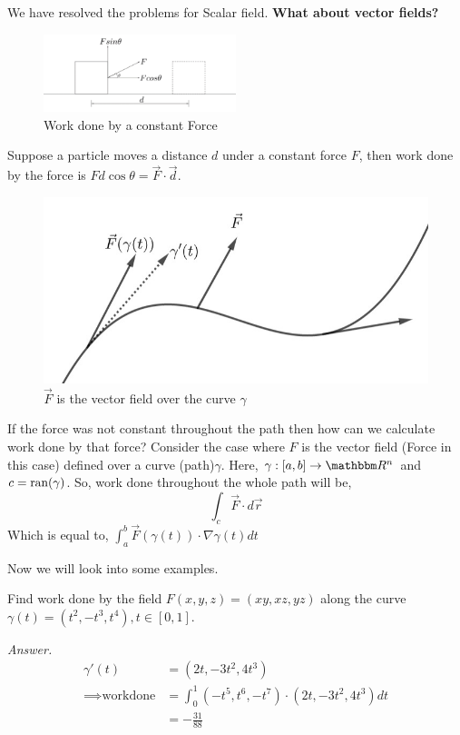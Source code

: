 \documentclass[../Analysis-3]{subfiles}
\begin{document}
We have resolved the problems for Scalar field. \textbf{What about vector fields?}
\begin{figure}[H]
    \centering
    \includegraphics[width=0.5\textwidth]{../figures/lec-23.2.png}
    \caption{Work done by a constant Force}
\end{figure}
Suppose a particle moves a distance $d$ under a constant force $F$, then work done by the force is $Fd\cos{\theta} = \vec{F}\cdot\vec{d}$.


\begin{figure}
    \centering
    \includegraphics[width=.98\linewidth]{../figures/lec-23.3.png}
    \caption{$\vec{F}$ is the vector field over the curve $\gamma$}
\end{figure}

If the force was not constant throughout the path then how can we calculate work done by that force?
Consider the case where $F$ is the vector field (Force in this case) defined over a curve (path)$\gamma$. Here, $\gamma : [a,b] \to \R^n$ and $c = \operatorname{ran}(\gamma)$. So, work done throughout the whole path will be,
\[\int_c \vec{F}\cdot d\vec{r}\]
Which is equal to, $\int_a^b \vec{F}(\gamma(t))\cdot \nabla \gamma(t) dt$

Now we will look into some examples.
\vspace{0.3cm}

\begin{Eg}{}{}
    Find work done by the field $F(x,y,z) = (xy,xz,yz)$ along the curve $\gamma(t) = (t^2,-t^3,t^4),t \in [0,1]$.

    \textit{Answer.} \begin{align*}
        \gamma'(t)               & = (2t,-3t^2,4t^3)                                 \\
        \implies \text{workdone} & = \int_0^1 (-t^5,t^6,-t^7)\cdot(2t,-3t^2,4t^3) dt \\
                                 & = -\frac{31}{88}
    \end{align*}
\end{Eg}
\end{document}

